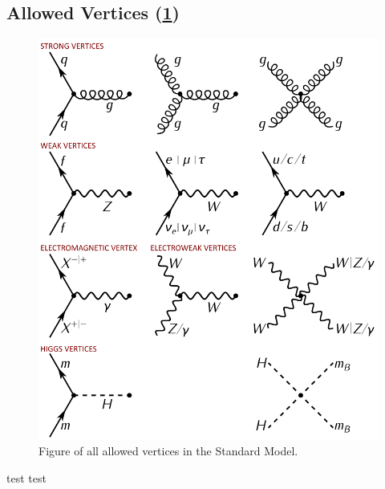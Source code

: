\documentclass{article}
\begin{document}
\subsection{Allowed Vertices (\cref{fig: feynman_diagram_vertices})}
\begin{figure}[h!]
\centering
\includegraphics[width = \textwidth]{feynman_diagram_vertices.png}
\caption{Figure of all allowed vertices in the Standard Model.}
\label{fig: feynman_diagram_vertices}
\end{figure}


test 
test
\end{document}
